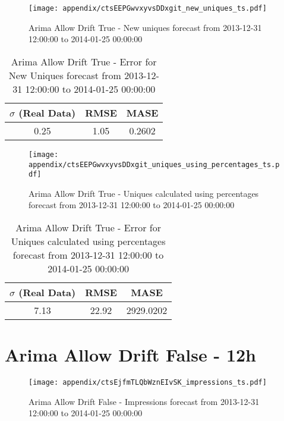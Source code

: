 \begin{figure}[H] \begin{center} \leavevmode
\texttt{[image: appendix/ctsEEPGwvxyvsDDxgit\_new\_uniques\_ts.pdf]} \caption{
Arima Allow Drift True - New uniques forecast from 2013-12-31 12:00:00 to 2014-01-25 00:00:00} \label{fig:appendix/ctsEEPGwvxyvsDDxgit_new_uniques_ts.pdf} \end{center}
\end{figure}

\begin{table}[H]
\centering
\footnotesize
\begin{tabular}{ccc}
$\sigma$ (Real Data) & RMSE & MASE   \\ \hline
0.25 & 1.05 & 0.2602 \\
\end{tabular}

\vspace{0.5cm}

\caption{
Arima Allow Drift True - Error for New Uniques forecast from 2013-12-31 12:00:00 to 2014-01-25 00:00:00}
\end{table}

\begin{figure}[H] \begin{center} \leavevmode
\texttt{[image: appendix/ctsEEPGwvxyvsDDxgit\_uniques\_using\_percentages\_ts.pdf]} \caption{
Arima Allow Drift True - Uniques calculated using percentages forecast from 2013-12-31 12:00:00 to 2014-01-25 00:00:00} \label{fig:appendix/ctsEEPGwvxyvsDDxgit_uniques_using_percentages_ts.pdf} \end{center}
\end{figure}

\begin{table}[H]
\centering
\footnotesize
\begin{tabular}{ccc}
$\sigma$ (Real Data) & RMSE & MASE   \\ \hline
7.13 & 22.92 & 2929.0202 \\
\end{tabular}

\vspace{0.5cm}

\caption{
Arima Allow Drift True - Error for Uniques calculated using percentages forecast from 2013-12-31 12:00:00 to 2014-01-25 00:00:00}
\end{table}

\section{Arima Allow Drift False - 12h}
\begin{figure}[H] \begin{center} \leavevmode
\texttt{[image: appendix/ctsEjfmTLQbWznEIvSK\_impressions\_ts.pdf]} \caption{
Arima Allow Drift False - Impressions forecast from 2013-12-31 12:00:00 to 2014-01-25 00:00:00} \label{fig:appendix/ctsEjfmTLQbWznEIvSK_impressions_ts.pdf} \end{center}
\end{figure}

